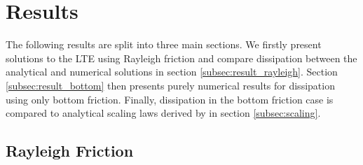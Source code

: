 \section{Results \label{sec:results}}

The following results are split into three main sections. We firstly present solutions to the LTE using Rayleigh friction and compare dissipation between the analytical and numerical solutions in section \ref{subsec:result_rayleigh}. Section \ref{subsec:result_bottom} then presents purely numerical results for dissipation using only bottom friction. Finally, dissipation in the bottom friction case is compared to analytical scaling laws derived by \citet{chen2013tidal} in section \ref{subsec:scaling}.

\subsection{Rayleigh Friction \label{subsec:result_rayleigh}}
